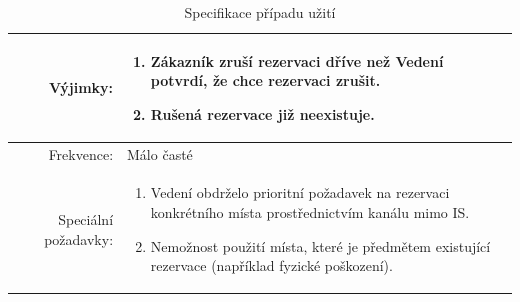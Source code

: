 \documentclass[a4paper,10pt]{article}
\begin{document}
\begin{center}
\begin{table}[ht!]
{\begin{tabular}{| r | p{12cm} |}
    \hline
    Výjimky: & 
    \begin{minipage}[t]{0.75\textwidth}
    	\begin{enumerate}[nosep,after=\strut]
    		\item Zákazník zruší rezervaci dříve než Vedení potvrdí, že chce rezervaci zrušit.
            \item Rušená rezervace již neexistuje. 
    	\end{enumerate}
  	\end{minipage} \\
    \hline
    Frekvence: & Málo časté \\
    \hline
    Speciální požadavky: & 
    \begin{minipage}[t]{0.75\textwidth}
    	\begin{enumerate}[nosep,after=\strut]
    		\item Vedení obdrželo prioritní požadavek na rezervaci konkrétního místa prostřednictvím kanálu mimo IS.
            \item Nemožnost použití místa, které je předmětem existující rezervace (například fyzické poškození).
    	\end{enumerate}
  	\end{minipage} \\
    \hline
\end{tabular}}
\caption{Specifikace případu užití }
\label{table:7}
\end{table}
\end{center}
\end{document}
